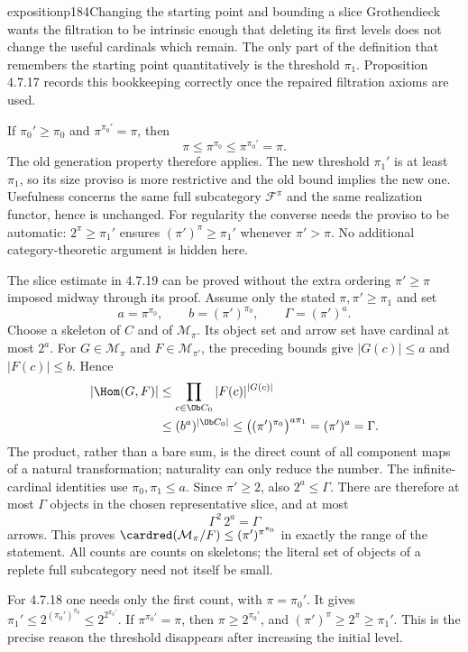 \begin{dcomment}{exposition}{p184}{Changing the starting point and bounding a slice}
Grothendieck wants the filtration to be intrinsic enough that deleting its first levels does not change the useful cardinals which remain. The only part of the definition that remembers the starting point quantitatively is the threshold $\pi_1$. Proposition 4.7.17 records this bookkeeping correctly once the repaired filtration axioms are used.

If $\pi_0'\geq\pi_0$ and $\pi^{\pi_0'}=\pi$, then
\[
 \pi\leq\pi^{\pi_0}\leq\pi^{\pi_0'}=\pi.
\]
The old generation property therefore applies. The new threshold $\pi_1'$ is at least $\pi_1$, so its size proviso is more restrictive and the old bound implies the new one. Usefulness concerns the same full subcategory $\mathcal F^\pi$ and the same realization functor, hence is unchanged. For regularity the converse needs the proviso to be automatic: $2^\pi\geq\pi_1'$ ensures $(\pi')^\pi\geq\pi_1'$ whenever $\pi'>\pi$. No additional category-theoretic argument is hidden here.

The slice estimate in 4.7.19 can be proved without the extra ordering $\pi'\geq\pi$ imposed midway through its proof. Assume only the stated $\pi,\pi'\geq\pi_1$ and set
\[
 a=\pi^{\pi_0},\qquad b=(\pi')^{\pi_0},\qquad
 \Gamma=(\pi')^a.
\]
Choose a skeleton of $C$ and of $\mathcal M_\pi$. Its object set and arrow set have cardinal at most $2^a$. For $G\in\mathcal M_\pi$ and $F\in\mathcal M_{\pi'}$, the preceding bounds give $|G(c)|\leq a$ and $|F(c)|\leq b$. Hence
\[
 \begin{split}
 |\Hom(G,F)|
 &\leq\prod_{c\in\Ob C_0}|F(c)|^{|G(c)|}\\
 &\leq(b^a)^{|\Ob C_0|}
 \leq\bigl((\pi')^{\pi_0}\bigr)^{a\pi_1}
 =(\pi')^a=\Gamma.
 \end{split}
\]
The product, rather than a bare sum, is the direct count of all component maps of a natural transformation; naturality can only reduce the number. The infinite-cardinal identities use $\pi_0,\pi_1\leq a$. Since $\pi'\geq2$, also $2^a\leq\Gamma$. There are therefore at most $\Gamma$ objects in the chosen representative slice, and at most
\[
 \Gamma^2\,2^a=\Gamma
\]
arrows. This proves $\cardred(\mathcal M_\pi/F)\leq(\pi')^{\pi^{\pi_0}}$ in exactly the range of the statement. All counts are counts on skeletons; the literal set of objects of a replete full subcategory need not itself be small.

For 4.7.18 one needs only the first count, with $\pi=\pi_0'$. It gives $\pi_1'\leq2^{(\pi_0')^{\pi_0}}\leq2^{2^{\pi_0'}}$. If $\pi^{\pi_0'}=\pi$, then $\pi\geq2^{\pi_0'}$, and $(\pi')^\pi\geq2^\pi\geq\pi_1'$. This is the precise reason the threshold disappears after increasing the initial level.
\end{dcomment}

